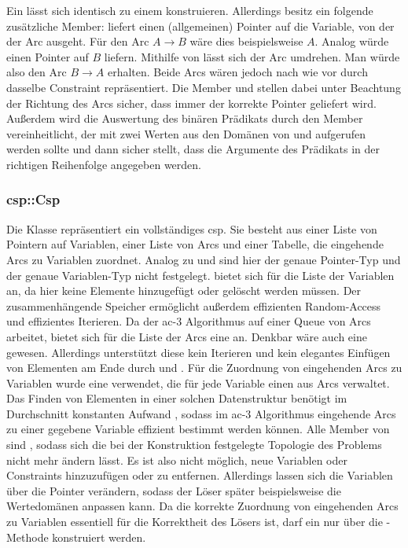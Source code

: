 Ein  lässt sich identisch zu einem  konstruieren. Allerdings besitz ein  folgende zusätzliche Member: 
liefert einen (allgemeinen) Pointer auf die Variable, von der der Arc ausgeht. Für den Arc $A \rightarrow B$ wäre dies beispielsweise $A$. Analog würde  einen
Pointer auf $B$ liefern. Mithilfe von  lässt sich der Arc umdrehen. Man würde also den Arc $B \rightarrow A$ erhalten. Beide Arcs wären jedoch nach wie vor
durch dasselbe Constraint repräsentiert. Die Member  und  stellen dabei unter Beachtung der Richtung des Arcs sicher, dass immer der korrekte
Pointer geliefert wird. Außerdem wird die Auswertung des binären Prädikats durch den Member  vereinheitlicht, der mit zwei Werten aus den Domänen
von  und  aufgerufen werden sollte und dann sicher stellt, dass die Argumente des Prädikats in der richtigen Reihenfolge angegeben werden.

\subsubsection{csp::Csp}
Die Klasse  repräsentiert ein vollständiges \ac*{csp}. Sie besteht aus einer Liste von Pointern auf Variablen, einer Liste von Arcs und einer Tabelle, die
eingehende Arcs zu Variablen zuordnet. Analog zu  und  sind hier der genaue Pointer-Typ und der genaue Variablen-Typ nicht festgelegt.
 bietet sich für die Liste der Variablen an, da hier keine Elemente hinzugefügt oder gelöscht werden müssen. Der zusammenhängende Speicher ermöglicht außerdem
effizienten Random-Access und effizientes Iterieren. Da der \ac*{ac}-3 Algorithmus auf einer Queue von Arcs arbeitet, bietet sich für die Liste der Arcs eine 
an. Denkbar wäre auch eine  gewesen. Allerdings unterstützt diese kein Iterieren und kein elegantes Einfügen von Elementen am Ende durch
 und . Für die Zuordnung von eingehenden Arcs zu Variablen wurde eine  verwendet, die für jede Variable
einen  aus Arcs verwaltet. Das Finden von Elementen in einer solchen Datenstruktur benötigt im Durchschnitt konstanten Aufwand \cite{uMap}, sodass im \ac*{ac}-3
Algorithmus eingehende Arcs zu einer gegebene Variable effizient bestimmt werden können. Alle Member von  sind , sodass sich die bei der Konstruktion
festgelegte Topologie des Problems nicht mehr ändern lässt. Es ist also nicht möglich, neue Variablen oder Constraints hinzuzufügen oder zu entfernen. Allerdings lassen sich die
Variablen über die Pointer verändern, sodass der Löser später beispielsweise die Wertedomänen anpassen kann. Da die korrekte Zuordnung von eingehenden Arcs zu Variablen essentiell
für die Korrektheit des Lösers ist, darf ein  nur über die -Methode  konstruiert werden.

